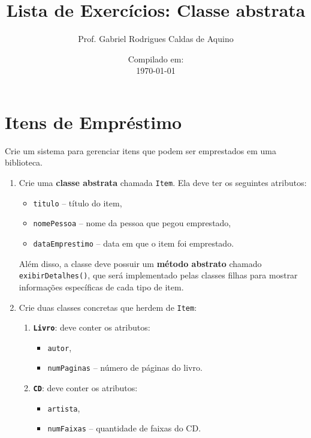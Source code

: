 \documentclass{article}
\title{Lista de Exercícios: Classe abstrata}
\author{Prof. Gabriel Rodrigues Caldas de Aquino}
\date{Compilado em: \\ \today}
\begin{document}
\maketitle

\section{Itens de Empréstimo}

Crie um sistema para gerenciar itens que podem ser emprestados em uma biblioteca.

\begin{enumerate}
    \item Crie uma \textbf{classe abstrata} chamada \texttt{Item}.
          Ela deve ter os seguintes atributos:
          \begin{itemize}
              \item \texttt{titulo} -- título do item,
              \item \texttt{nomePessoa} -- nome da pessoa que pegou emprestado,
              \item \texttt{dataEmprestimo} -- data em que o item foi emprestado.
          \end{itemize}
          Além disso, a classe deve possuir um \textbf{método abstrato} chamado \texttt{exibirDetalhes()},
          que será implementado pelas classes filhas para mostrar informações específicas de cada tipo de item.

    \item Crie duas classes concretas que herdem de \texttt{Item}:
          \begin{enumerate}
              \item \textbf{\texttt{Livro}}: deve conter os atributos:
                    \begin{itemize}
                        \item \texttt{autor},
                        \item \texttt{numPaginas} -- número de páginas do livro.
                    \end{itemize}

              \item \textbf{\texttt{CD}}: deve conter os atributos:
                    \begin{itemize}
                        \item \texttt{artista},
                        \item \texttt{numFaixas} -- quantidade de faixas do CD.
                    \end{itemize}
          \end{enumerate}


\end{enumerate}
\end{document}
